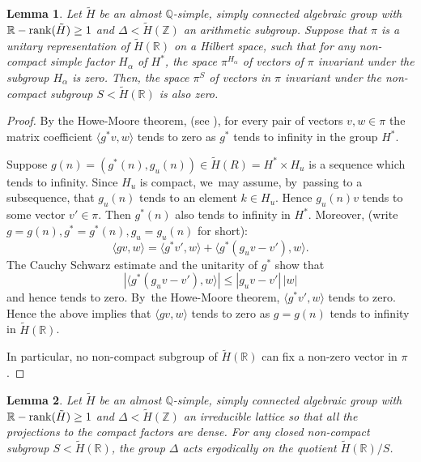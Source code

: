 \documentclass[10pt,a4paper]{amsart}
\let\<\langle
\let\>\rangle
\newcommand{\Rrank}{\R\textup{-}\rank}
\newtheorem{lemma}{Lemma}
\theoremstyle{definition}
\newcommand{\field}[1]{\mathbb{#1}}
\newcommand{\Q}{\field{Q}}
\newcommand{\R}{\field{R}}
\newcommand{\Z}{\field{Z}}
\newcommand{\rank}{{\operatorname{rank}}}
\begin{document}
\begin{lemma}\label{howemoore} Let $\tilde{H}$ be an almost $\Q$-simple, simply connected algebraic group with $\Rrank(\tilde{H})\geq 1$ and $\Delta < \tilde{H}(\Z)$ an arithmetic subgroup. Suppose that $\pi$ is a unitary representation of $\tilde H(\R)$ on a Hilbert space, such that for any \emph{non-compact} simple factor $H_{\alpha }$ of $H^*$, the space $\pi ^{H_{\alpha }}$ of vectors of $\pi $ invariant under the subgroup $H_{\alpha}$ is zero. Then, the space $\pi ^{S}$ of vectors in $\pi $ invariant under the non-compact subgroup $S<\tilde H(\R)$ is also zero.
\end{lemma}

\begin{proof} By the Howe-Moore theorem, (see \cite[Th.\,(2.2.20)]{Z}), for every pair of vectors $v,w\in \pi$ the matrix coefficient $\<g^*v,w\>$ tends to zero as $g^*$ tends to infinity in the group $H^*$.

Suppose $g(n)=(g^*(n),g_u(n)) \in \tilde{H}(R)=H^* \times H_u$ is a sequence which tends to infinity. Since $H_u$ is compact, we~may assume, by~passing to a subsequence, that $g_u(n)$ tends to an element $k\in H_u$.
Hence $g_u(n)v$ tends to some vector $v'\in \pi$. Then $g^*(n)$ also tends to infinity in $H^*$. Moreover, (write $g=g(n), g^*=g^*(n),g_u=g_u(n)$ for short):
\[
\<gv,w\>=\<g^*v',w\>+ \<g^*(g_uv-v'),w\>.
\]
The Cauchy Schwarz estimate and the unitarity of $g^*$ show that
\[
|\<g^*(g_uv-v'),w\>| \leq | g_uv-v'|\, |w|
\]
and hence tends to zero. By~the Howe-Moore theorem, $\<g^*v',w\>$ tends to zero. Hence the above implies that $\<gv,w\>$ tends to zero as $g= g(n)$ tends to infinity in $\tilde{H}(\R)$.

In particular, no non-compact subgroup of $\tilde H(\R)$ can fix a non-zero vector in $\pi$.
\end{proof}

\begin{lemma}\label{mautner} Let $\tilde{H}$ be an almost $\Q$-simple, simply connected algebraic group with
$\Rrank(\tilde{H})\geq 1$ and $\Delta <\tilde{H}(\Z)$ an irreducible lattice so that all the projections to the compact factors are dense. For any closed non-compact subgroup $S<\tilde{H}(\R)$, the group $\Delta$ acts ergodically on the quotient $\tilde{H}(\R)/S$.
\end{lemma}
\end{document}
